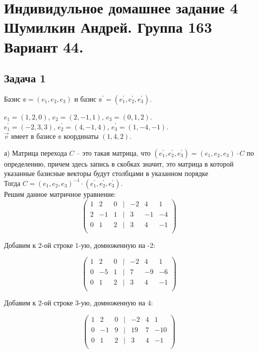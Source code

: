 

	\section{Индивидульное домашнее задание 4 \\ Шумилкин Андрей. Группа 163 \\ Вариант 44. } 
	\subsection{Задача 1} 
	Базис $\mathbb{e} = (e_1, e_2, e_3)$ и базис $\mathbb{e}^\prime = (e_1^\prime, e_2^\prime, e_3^\prime)$.
	
	$e_1 = (1, 2, 0)$, $e_2 = (2, -1, 1)$, $e_3 = (0, 1, 2)$. \\
	$e_1^\prime = (-2, 3, 3)$, $e_2^\prime = (4, -1, 4)$, $e_3^\prime = (1, -4, -1)$. \\
	
	$\vec v$ имеет в базисе $\mathbb{e}$ координаты $(1, 4, 2)$.
	
	а)
	Матрица перехода $C$ -- это такая матрица, что $(e_1^\prime, e_2^\prime, e_3^\prime) = (e_1, e_2, e_3) \cdot C$ по определению, причем здесь запись в скобках значит, это матрица в которой указанные базисные векторы будут столбцами в указанном порядке\\
	Тогда $C = (e_1, e_2, e_3)^{-1} \cdot (e_1^\prime, e_2^\prime, e_3^\prime)$. \\
	Решим данное матричное уравнение: 
	\[
	\begin{pmatrix}
	1 & 2 & 0 & | & -2 & 4 & 1 \\
	2 & -1 & 1 & | & 3 & -1 & -4 \\
	0 & 1 & 2 & | & 3 & 4 & -1 \\
	\end{pmatrix}
	\]
	
	Добавим к 2-ой строке 1-ую, домноженную на -2:
	
	\[
	\begin{pmatrix}
	1 & 2 & 0 & | & -2 & 4 & 1 \\
	0 & -5 & 1 & | & 7 & -9 & -6 \\
	0 & 1 & 2 & | & 3 & 4 & -1 \\
	\end{pmatrix}
	\]
	
	Добавим к 2-ой строке 3-ую, домноженную на 4:
	
	\[
	\begin{pmatrix}
	1 & 2 & 0 & | & -2 & 4 & 1 \\
	0 & -1 & 9 & | & 19 & 7 & -10 \\
	0 & 1 & 2 & | & 3 & 4 & -1 \\
	\end{pmatrix}
	\]
	
